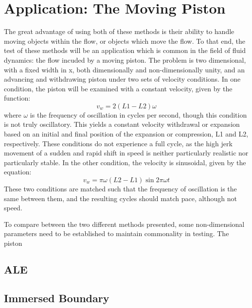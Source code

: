 \documentclass{article}
\begin{document}

\section{Application: The Moving Piston}

The great advantage of using both of these methods is their ability to handle moving objects within the flow, or objects which move the flow.  To that end, the test of these methods will be an application which is common in the field of fluid dynamics: the flow incuded by a moving piston.  The problem is two dimensional, with a fixed width in x, both dimensionally and non-dimensionally unity, and an advancing and withdrawing piston under two sets of velocity conditions.  In one condition, the piston will be examined with a constant velocity, given by the function:
\begin{equation}
  v_w = 2 (L1-L2) \omega
\end{equation}
where $\omega$ is the frequency of oscillation in cycles per second, though this condition is not truly oscillatory.  This yields a constant velocity withdrawal or expansion based on an initial and final position of the expansion or compression, L1 and L2, respectively.  These conditions do not experience a full cycle, as the high jerk movement of a sudden and rapid shift in speed is neither particularly realistic nor particularly stable.  In the other condition, the velocity is sinusoidal, given by the equation:
\begin{equation}
  v_w = \pi \omega (L2-L1) \sin{2 \pi \omega t}
\end{equation}
These two conditions are matched such that the frequency of oscillation is the same between them, and the resulting cycles should match pace, although not speed.  

To compare between the two different methods presented, some non-dimensional parameters need to be established to maintain commonality in testing.  The piston

\subsection{ALE}



\subsection{Immersed Boundary}
\end{document}
